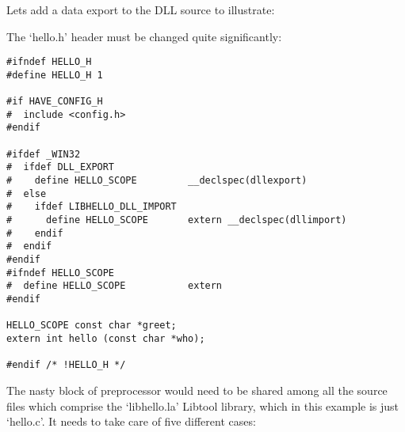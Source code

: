 Lets add a data export to the DLL source to illustrate:

The `hello.h' header must be changed quite significantly:


\begin{Verbatim}[frame=single]
#ifndef HELLO_H
#define HELLO_H 1

#if HAVE_CONFIG_H
#  include <config.h>
#endif

#ifdef _WIN32
#  ifdef DLL_EXPORT
#    define HELLO_SCOPE         __declspec(dllexport)
#  else
#    ifdef LIBHELLO_DLL_IMPORT
#      define HELLO_SCOPE       extern __declspec(dllimport)
#    endif
#  endif
#endif
#ifndef HELLO_SCOPE
#  define HELLO_SCOPE           extern
#endif

HELLO_SCOPE const char *greet; 
extern int hello (const char *who);

#endif /* !HELLO_H */
\end{Verbatim}

The nasty block of preprocessor would need to be shared among all the source files which comprise the `libhello.la' Libtool library, which in this example is just `hello.c'. It needs to take care of five different cases:

